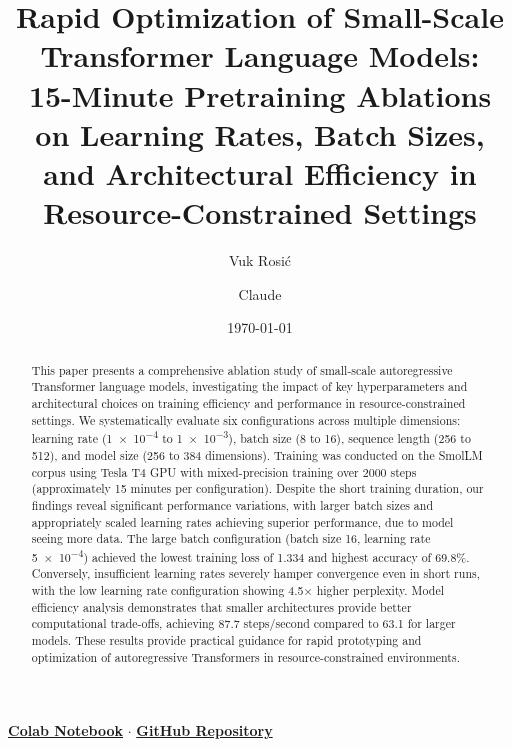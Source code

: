 \documentclass[11pt,a4paper]{article}
\title{\Large\bfseries Rapid Optimization of Small-Scale Transformer Language Models:\\[0.3em]
\large 15-Minute Pretraining Ablations on Learning Rates, Batch Sizes, and Architectural Efficiency in Resource-Constrained Settings}
\author[1]{Vuk Rosić}
\author[2]{Claude}
\affil[1]{Óbuda University, \texttt{vukrosic1@gmail.com}}
\affil[2]{Anthropic}
\date{\today}
\begin{document}
\maketitle

\begin{center}
\textbf{\href{https://colab.research.google.com/drive/1Fn5Dw-8xKKSt915dwNvqLwA7V0Bdw0IY?usp=sharing}{Colab Notebook}} $\cdot$
\textbf{\href{https://github.com/vukrosic/do-small-llm-research}{GitHub Repository}}
\end{center}

\begin{abstract}
This paper presents a comprehensive ablation study of small-scale autoregressive Transformer language models, investigating the impact of key hyperparameters and architectural choices on training efficiency and performance in resource-constrained settings. We systematically evaluate six configurations across multiple dimensions: learning rate (\num{1e-4} to \num{1e-3}), batch size (8 to 16), sequence length (256 to 512), and model size (256 to 384 dimensions). Training was conducted on the SmolLM corpus using Tesla T4 GPU with mixed-precision training over 2000 steps (approximately 15 minutes per configuration). Despite the short training duration, our findings reveal significant performance variations, with larger batch sizes and appropriately scaled learning rates achieving superior performance, due to model seeing more data. The large batch configuration (batch size 16, learning rate \num{5e-4}) achieved the lowest training loss of 1.334 and highest accuracy of 69.8\%. Conversely, insufficient learning rates severely hamper convergence even in short runs, with the low learning rate configuration showing 4.5× higher perplexity. Model efficiency analysis demonstrates that smaller architectures provide better computational trade-offs, achieving 87.7 steps/second compared to 63.1 for larger models. These results provide practical guidance for rapid prototyping and optimization of autoregressive Transformers in resource-constrained environments.
\end{abstract}
\end{document}
